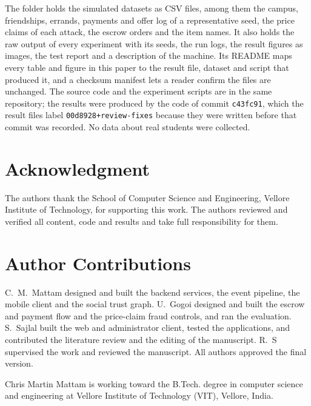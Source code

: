 \documentclass[journal]{IEEEtran}
\newcommand{\code}[1]{\texttt{#1}}
\begin{document}
\noindent The folder holds the simulated datasets as CSV files, among them the campus,
friendships, errands, payments and offer log of a representative seed, the price
claims of each attack, the escrow orders and the item names. It also holds the raw
output of every experiment with its seeds, the run logs, the result figures as
images, the test report and a description of the machine. Its README maps every
table and figure in this paper to the result file, dataset and script that produced
it, and a checksum manifest lets a reader confirm the files are unchanged. The source
code and the experiment scripts are in the same repository; the results were
produced by the code of commit \code{c43fc91}, which the result files label
\code{00d8928+review-fixes} because they were written before that commit was
recorded. No data about real students were collected.

\section*{Acknowledgment}
The authors thank the School of Computer Science and Engineering, Vellore Institute
of Technology, for supporting this work. The authors reviewed and verified all
content, code and results and take full responsibility for them.




\section*{Author Contributions}
C.~M.~Mattam designed and built the backend services, the event pipeline, the
mobile client and the social trust graph. U.~Gogoi designed and built the escrow and
payment flow and the price-claim fraud controls, and ran the evaluation.
S.~Sajlal built the web and administrator client, tested the applications, and
contributed the literature review and the editing of the manuscript. R.~S supervised
the work and reviewed the manuscript. All authors approved the final version.

\begin{IEEEbiographynophoto}{Chris Martin Mattam}
is working toward the B.Tech. degree in computer science and engineering at Vellore
Institute of Technology (VIT), Vellore, India.
\end{IEEEbiographynophoto}
\end{document}
